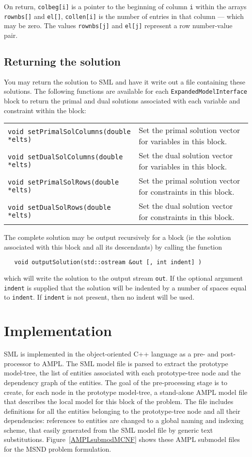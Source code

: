 \documentclass[10pt,a4paper]{report}
\begin{document}
On return, {\tt colbeg[i]} is a pointer to the beginning of column {\tt i}
within the arrays {\tt rownbs[]} and {\tt el[]}, {\tt collen[i]} is the number
of entries in that column --- which may be zero. The values {\tt rownbs[j]} and
{\tt el[j]} represent a row number-value pair.

\subsection{Returning the solution}
You may return the solution to SML and have it write out a file containing
these solutions. The following functions are available for each
{\tt ExpandedModelInterface} block to return the primal and dual solutions
associated with each variable and constraint within the block: \\
\begin{tabular}{ll}
{\tt void setPrimalSolColumns(double *elts)} & 
   Set the primal solution vector for variables in this block. \\
{\tt void setDualSolColumns(double *elts)} & 
   Set the dual solution vector for variables in this block. \\
{\tt void setPrimalSolRows(double *elts)} & 
   Set the primal solution vector for constraints in this block. \\
{\tt void setDualSolRows(double *elts)} & 
   Set the dual solution vector for constraints in this block.
\end{tabular}

The complete solution may be output recursively for a block (ie the solution
associated with this block and all its descendants) by calling the function
\begin{verbatim}
   void outputSolution(std::ostream &out [, int indent] )
\end{verbatim}
which will write the solution to the output stream {\tt out}. If the optional
argument {\tt indent} is supplied that the solution will be indented by a
number of spaces equal to {\tt indent}. If {\tt indent} is not present, then
no indent will be used.

\section{Implementation} \label{implementation}

SML is implemented in the object-oriented C++ language as a
pre- and post-processor to AMPL.  
The SML model file
is parsed to extract the prototype model-tree, the list of entities
associated with each prototype-tree node and the dependency graph of
the entities. 
The goal of the pre-processing stage is to create, for each node in the
prototype model-tree, a stand-alone AMPL model file that describes the
local model for this block of the problem. 
The file includes definitions for all the
entities belonging to the prototype-tree node and all their
dependencies: references to entities are changed to a
global naming and indexing scheme, that easily generated from the
SML model file by generic text substitutions.  
Figure~\ref{AMPLsubmodMCNF} shows these AMPL submodel files for the MSND problem formulation. 
\end{document}
